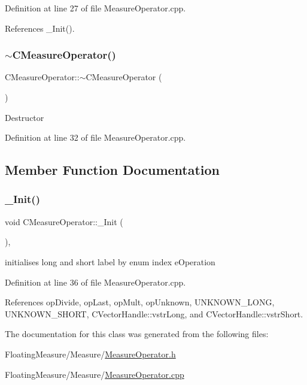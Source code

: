 Definition at line 27 of file Measure\+Operator.\+cpp.



References \+\_\+\+Init().

\mbox{\label{classCMeasureOperator_acf2f26e41d5228767e4c098988cfaa89}} 
\subsubsection{\texorpdfstring{$\sim$\+C\+Measure\+Operator()}{~CMeasureOperator()}}
{\footnotesize\ttfamily C\+Measure\+Operator\+::$\sim$\+C\+Measure\+Operator (\begin{DoxyParamCaption}{ }\end{DoxyParamCaption})}

Destructor 

Definition at line 32 of file Measure\+Operator.\+cpp.



\subsection{Member Function Documentation}
\mbox{\label{classCMeasureOperator_aa0d73fc93150362e4c7617f9ddb5e722}} 
\subsubsection{\texorpdfstring{\+\_\+\+Init()}{\_Init()}}
{\footnotesize\ttfamily void C\+Measure\+Operator\+::\+\_\+\+Init (\begin{DoxyParamCaption}{ }\end{DoxyParamCaption})\hspace{0.3cm}{\ttfamily [protected]}, {\ttfamily [virtual]}}



initialises long and short label by enum index e\+Operation 



Definition at line 36 of file Measure\+Operator.\+cpp.



References op\+Divide, op\+Last, op\+Mult, op\+Unknown, U\+N\+K\+N\+O\+W\+N\+\_\+\+L\+O\+NG, U\+N\+K\+N\+O\+W\+N\+\_\+\+S\+H\+O\+RT, C\+Vector\+Handle\+::vstr\+Long, and C\+Vector\+Handle\+::vstr\+Short.



The documentation for this class was generated from the following files\+:\begin{DoxyCompactItemize}
\item 
Floating\+Measure/\+Measure/\hyperlink{MeasureOperator_8h}{Measure\+Operator.\+h}\item 
Floating\+Measure/\+Measure/\hyperlink{MeasureOperator_8cpp}{Measure\+Operator.\+cpp}\end{DoxyCompactItemize}
